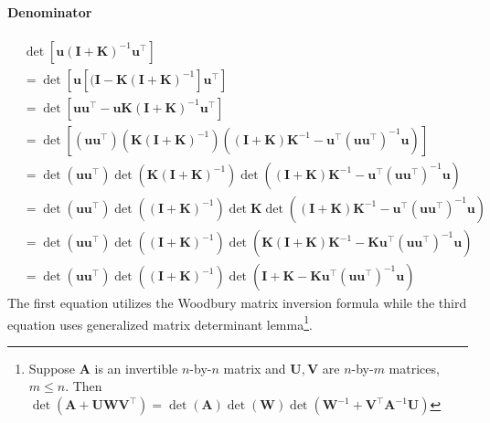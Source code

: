 \paragraph{Denominator}
\begin{align}
&\det[\mathbf{u} (\mathbf{I} + \mathbf{K})^{-1} \mathbf{u}^\top] \nonumber
\\ 
&= \det [\mathbf{u} \left[ (\mathbf{I} - \mathbf{K}(\mathbf{I}+\mathbf{K})^{-1}\right]\mathbf{u}^\top] \nonumber
\\
&=\det [\mathbf{u} \mathbf{u}^\top - \mathbf{u} \mathbf{K}(\mathbf{I}+\mathbf{K})^{-1} \mathbf{u}^\top]  \nonumber
\\
&= \det \left[  (\mathbf{u} \mathbf{u}^\top) \left(\mathbf{K}(\mathbf{I}+\mathbf{K})^{-1}\right) \left( (\mathbf{I} + \mathbf{K}) \mathbf{K}^{-1} - \mathbf{u}^\top (\mathbf{u} \mathbf{u}^\top)^{-1} \mathbf{u}\right) \right] \nonumber
\\
&= \det (\mathbf{u} \mathbf{u}^\top) \det \left(\mathbf{K}(\mathbf{I}+\mathbf{K})^{-1}\right) \det \left( (\mathbf{I} + \mathbf{K}) \mathbf{K}^{-1} - \mathbf{u}^\top (\mathbf{u} \mathbf{u}^\top)^{-1} \mathbf{u}\right) \nonumber 
\\
&= \det (\mathbf{u} \mathbf{u}^\top) \det \left((\mathbf{I}+\mathbf{K})^{-1}\right) \det \mathbf{K} \det \left( (\mathbf{I} + \mathbf{K}) \mathbf{K}^{-1} - \mathbf{u}^\top (\mathbf{u} \mathbf{u}^\top)^{-1} \mathbf{u}\right) \nonumber 
\\
& = \det (\mathbf{u} \mathbf{u}^\top) \det \left((\mathbf{I}+\mathbf{K})^{-1}\right) \det \left( \mathbf{K}(\mathbf{I} + \mathbf{K}) \mathbf{K}^{-1} - \mathbf{K}\mathbf{u}^\top (\mathbf{u} \mathbf{u}^\top)^{-1} \mathbf{u}\right)  \label{Eqn:u_K_inv_uT}
\\
& = \det (\mathbf{u} \mathbf{u}^\top) \det \left((\mathbf{I}+\mathbf{K})^{-1}\right) \det \left(\mathbf{I} + \mathbf{K} - \mathbf{K}\mathbf{u}^\top (\mathbf{u} \mathbf{u}^\top)^{-1} \mathbf{u}\right) \nonumber
\end{align}
The first equation utilizes the Woodbury matrix inversion formula while the third equation uses generalized matrix determinant lemma\footnote{Suppose $\mathbf{A}$ is an invertible $n$-by-$n$ matrix and $\mathbf{U}, \mathbf{V}$ are $n$-by-$m$ matrices, $m \le n$. Then $\det(\mathbf{A} + \mathbf{U}\mathbf{W}\mathbf{V}^\top) = \det(\mathbf{A}) \det(\mathbf{W})\det(\mathbf{W}^{-1} + \mathbf{V}^\top \mathbf{A}^{-1} \mathbf{U})$}.

